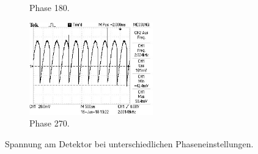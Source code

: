 \begin{figure}
\begin{subfigure}{0.48\textwidth}
    \caption{Phase 180.}
    \label{fig:phase180}
  \end{subfigure}
  \begin{subfigure}{0.48\textwidth}
    \centering
    \includegraphics[height=4cm]{phase270.jpg}
    \caption{Phase 270.}
    \label{fig:phase270}
  \end{subfigure}
  \caption{Spannung am Detektor bei unterschiedlichen Phaseneinstellungen.}
  \label{fig:logos}
\end{figure}

